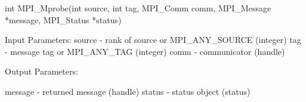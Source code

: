 int MPI_Mprobe(int source, int tag, MPI_Comm comm,
    MPI_Message *message, MPI_Status *status)

Input Parameters:
source - rank of source or MPI_ANY_SOURCE (integer)
tag    - message tag or MPI_ANY_TAG (integer)
comm   - communicator (handle)

Output Parameters:

message - returned message (handle)
status  - status object (status)
